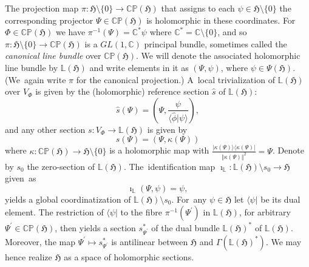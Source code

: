 \documentclass[12pt]{amsart}
\numberwithin{equation}{section}
\theoremstyle{remark}
\newcommand\HH{\mathfrak H}
\newcommand{\prhs}{{\mathbb C\mathbb P}( \HH)}
\newcommand{\C}{\mathbb C}
\begin{document}
The projection map $\pi : {\HH}\setminus\{ 0 \}  \to \prhs$  that assigns to
each $\psi \in {\HH}\setminus\{ 0\}$ the corresponding  projector $\Psi \in
\prhs$ is holomorphic in these coordinates. For $\Phi \in \prhs$ we have
$\pi^{-1}(\Psi) = {\C}^\ast \psi$ where $ {\C}^\ast=  {\C} \setminus \{0\}$,
and so  $\pi : {\HH} \setminus \{ 0\} \to \prhs$ is a $GL(1, {\C})$ principal
bundle, sometimes called the {\em canonical line bundle} over  $\prhs$. We will
denote the associated holomorphic line bundle by $\mathbb L(\HH)$ and write
elements in it as $(\Psi,\psi)$, where $\psi \in \Psi(\HH )$. (We~again write
$\pi$ for the canonical projection.) A~local trivialization of $\mathbb L(\HH)$
over $V_\Phi$ is given by the (holomorphic) reference section  $\hat s$ of
$\mathbb L(\HH)$:
\begin{equation}\label{unitsec}
  \hat s(\Psi) =(\Psi,\frac{\psi }{\langle\hat\phi\vert\psi \rangle}),
\end{equation}
and any other section $s: V_\Phi \to \mathbb L(\HH)$ is given by
\begin{equation}\label{kap}
s(\Psi) = (\Psi, \kappa(\Psi))
\end{equation}
where $\kappa : \prhs \to \HH \setminus \{0\}$ is a holomorphic map with
$\frac{\vert \kappa(\Psi) \rangle \langle \kappa(\Psi)\vert}{\Vert\kappa(\Psi)
\Vert^2} = \Psi$. Denote by $s_0$ the zero-section of $\mathbb L(\HH)$.
The~identification map $\imath_\mathbb L : \mathbb L(\HH) \setminus s_0\to \HH$
given~as
\begin{equation}\label{id}
\imath_\mathbb L (\Psi,\psi) = \psi ,
\end{equation}
yields a global coordinatization of $\mathbb L(\HH) \setminus s_0$.
For~any $\psi \in \HH$ let $\langle \psi \vert$ be its dual element.
The restriction of
$\langle \psi \vert$ to the fibre $\pi^{-1} (\Psi^\prime)$ in $\mathbb L(\HH)$,
for arbitrary
$\Psi^\prime \in \prhs$, then
yields a section $s^*_{\Psi^\prime}$ of the  dual bundle
$\mathbb L(\HH)^*$ of  $\mathbb L(\HH)$.
Moreover, the map $\Psi^\prime \mapsto  s^*_{\Psi^\prime}$ is antilinear
between  $\HH$ and
$\Gamma(\mathbb L(\HH)^*)$.  We may hence realize $\HH$ as a space of
holomorphic sections.
\end{document}
